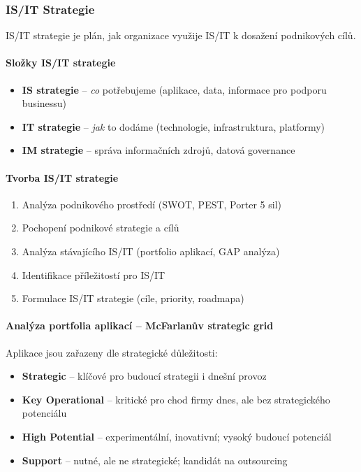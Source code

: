 \subsubsection{IS/IT Strategie}

IS/IT strategie je plán, jak organizace využije IS/IT k dosažení podnikových cílů.

\paragraph{Složky IS/IT strategie}
\begin{itemize}
  \item \textbf{IS strategie} -- \textit{co} potřebujeme (aplikace, data, informace pro podporu businessu)
  \item \textbf{IT strategie} -- \textit{jak} to dodáme (technologie, infrastruktura, platformy)
  \item \textbf{IM strategie} -- správa informačních zdrojů, datová governance
\end{itemize}

\paragraph{Tvorba IS/IT strategie}
\begin{enumerate}
  \item Analýza podnikového prostředí (SWOT, PEST, Porter 5 sil)
  \item Pochopení podnikové strategie a cílů
  \item Analýza stávajícího IS/IT (portfolio aplikací, GAP analýza)
  \item Identifikace příležitostí pro IS/IT
  \item Formulace IS/IT strategie (cíle, priority, roadmapa)
\end{enumerate}

\paragraph{Analýza portfolia aplikací -- McFarlanův strategic grid}
Aplikace jsou zařazeny dle strategické důležitosti:
\begin{itemize}
  \item \textbf{Strategic} -- klíčové pro budoucí strategii i dnešní provoz
  \item \textbf{Key Operational} -- kritické pro chod firmy dnes, ale bez strategického potenciálu
  \item \textbf{High Potential} -- experimentální, inovativní; vysoký budoucí potenciál
  \item \textbf{Support} -- nutné, ale ne strategické; kandidát na outsourcing
\end{itemize}

